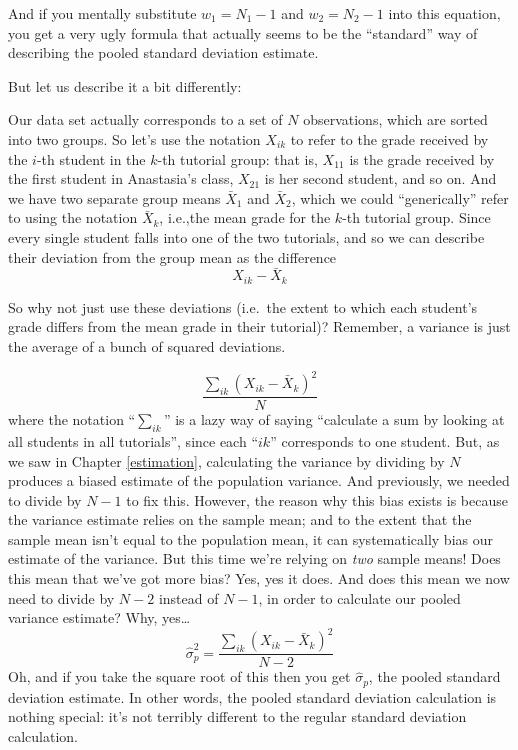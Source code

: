 \documentclass[
]{book}
\theoremstyle{definition}
\theoremstyle{definition}
\theoremstyle{definition}
\theoremstyle{definition}
\theoremstyle{remark}
\begin{document}
And if you mentally substitute \(w_1 = N_1 -1\) and \(w_2 = N_2 -1\) into this equation, you get a very ugly formula that actually seems to be the ``standard'' way of describing the pooled standard deviation estimate.

But let us describe it a bit differently:

Our data set actually corresponds to a set of \(N\) observations, which are sorted into two groups. So let's use the notation \(X_{ik}\) to refer to the grade received by the \(i\)-th student in the \(k\)-th tutorial group: that is, \(X_{11}\) is the grade received by the first student in Anastasia's class, \(X_{21}\) is her second student, and so on. And we have two separate group means \(\bar{X}_1\) and \(\bar{X}_2\), which we could ``generically'' refer to using the notation \(\bar{X}_k\), i.e.,the mean grade for the \(k\)-th tutorial group. Since every single student falls into one of the two tutorials, and so we can describe their deviation from the group mean as the difference
\[
X_{ik} - \bar{X}_k
\]

So why not just use these deviations (i.e.~the extent to which each student's grade differs from the mean grade in their tutorial)? Remember, a variance is just the average of a bunch of squared deviations.

\[
\frac{\sum_{ik} \left( X_{ik} - \bar{X}_k \right)^2}{N}
\]
where the notation ``\(\sum_{ik}\)'' is a lazy way of saying ``calculate a sum by looking at all students in all tutorials'', since each ``\(ik\)'' corresponds to one student. But, as we saw in Chapter \ref{estimation}, calculating the variance by dividing by \(N\) produces a biased estimate of the population variance. And previously, we needed to divide by \(N-1\) to fix this. However, the reason why this bias exists is because the variance estimate relies on the sample mean; and to the extent that the sample mean isn't equal to the population mean, it can systematically bias our estimate of the variance. But this time we're relying on \emph{two} sample means! Does this mean that we've got more bias? Yes, yes it does. And does this mean we now need to divide by \(N-2\) instead of \(N-1\), in order to calculate our pooled variance estimate? Why, yes\ldots{}
\[
\hat\sigma^2_p = \frac{\sum_{ik} \left( X_{ik} - \bar{X}_k \right)^2}{N -2}
\]
Oh, and if you take the square root of this then you get \(\hat{\sigma}_p\), the pooled standard deviation estimate. In other words, the pooled standard deviation calculation is nothing special: it's not terribly different to the regular standard deviation calculation.
\end{document}
